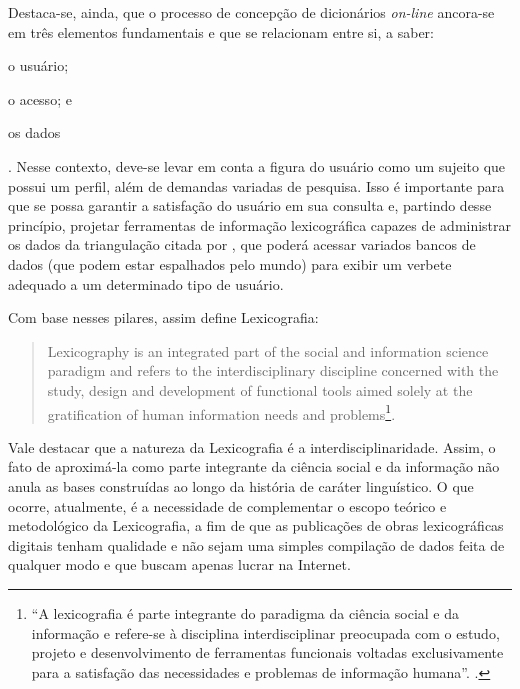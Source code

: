 \documentclass[portuguese]{textolivre}
\begin{document}
Destaca-se, ainda, que o processo de concepção de dicionários \textit{on-line} ancora-se em três elementos fundamentais e que se relacionam entre si, a saber: 
\begin{enumerate*}[label=\roman*)]
\item o usuário; 
\item o acesso; e 
\item os dados
\end{enumerate*}
\cite[p. 128]{leroyer2011}. Nesse contexto, deve-se levar em conta a figura do usuário como um sujeito que possui um perfil, além de demandas variadas de pesquisa. Isso é importante para que se possa garantir a satisfação do usuário em sua consulta e, partindo desse princípio, projetar ferramentas de informação lexicográfica capazes de administrar os dados da triangulação citada por \textcite[p. 128]{leroyer2011}, que poderá acessar variados bancos de dados (que podem estar espalhados pelo mundo) para exibir um verbete adequado a um determinado tipo de usuário.

Com base nesses pilares, \textcite[p. 129, tradução nossa]{leroyer2011} assim define Lexicografia:
\begin{quote}
    Lexicography is an integrated part of the social and information science paradigm   and refers to the interdisciplinary discipline concerned with the study, design and development of functional tools aimed solely at the gratification of human information needs and problems\footnote{“A lexicografia é parte integrante do paradigma da ciência social e da informação e refere-se à disciplina interdisciplinar preocupada com o estudo, projeto e desenvolvimento de ferramentas funcionais voltadas exclusivamente para a satisfação das necessidades e problemas de informação humana”. \cite[p. 129]{leroyer2011}.}.
\end{quote}

Vale destacar que a natureza da Lexicografia é a interdisciplinaridade. Assim, o fato de aproximá-la como parte integrante da ciência social e da informação não anula as bases construídas ao longo da história de caráter linguístico. O que ocorre, atualmente, é a necessidade de complementar o escopo teórico e metodológico da Lexicografia, a fim de que as publicações de obras lexicográficas digitais tenham  qualidade e não sejam uma simples compilação de dados feita de qualquer modo e que buscam apenas lucrar na Internet.
\end{document}
